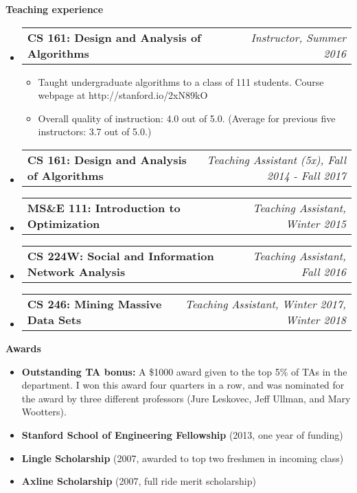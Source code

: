 \documentclass[letterpaper,10pt]{article}
\makeatletter
\newcommand{\resheading}[1]{{\large \colorbox{mygrey}{\begin{minipage}{\textwidth}{\textbf{#1 \vphantom{p\^{E}}}}\end{minipage}}}}
\newcommand{\ressubheading}[4]{
\begin{tabular*}{7.0in}{l@{\extracolsep{\fill}}r}
		\textbf{#1} & \textit{#4} \\
\end{tabular*}\vspace{-6pt}}
\makeatother
\begin{document}
\resheading{Teaching experience}
\begin{itemize}
\item
	\ressubheading{CS 161: Design and Analysis of Algorithms}{Stanford, CA}{Instructor}{Instructor, Summer 2016}
	\begin{itemize}
	\item Taught undergraduate algorithms to a class of 111 students.  Course webpage at http://stanford.io/2xN89kO
	\item Overall quality of instruction: 4.0 out of 5.0.  (Average for previous five instructors: 3.7 out of 5.0.)
	\end{itemize}
\item
	\ressubheading{CS 161: Design and Analysis of Algorithms}{Stanford, CA}{Teaching Assistant}{Teaching Assistant (5x), Fall 2014 - Fall 2017}
\item
	\ressubheading{MS\&E 111: Introduction to Optimization}{Stanford, CA}{Teaching Assistant}{Teaching Assistant, Winter 2015}
\item
	\ressubheading{CS 224W: Social and Information Network Analysis}{Stanford, CA}{Teaching Assistant}{Teaching Assistant, Fall 2016}
\item
	\ressubheading{CS 246: Mining Massive Data Sets}{Stanford, CA}{Teaching Assistant}{Teaching Assistant, Winter 2017, Winter 2018}
\end{itemize}

\resheading{Awards}
\begin{itemize}
    \item \textbf{Outstanding TA bonus:} A \$1000 award given to the top 5\% of TAs in the department.  I won this award four quarters in a row, and was nominated for the award by three different professors (Jure Leskovec, Jeff Ullman, and Mary Wootters).
	\item \textbf{Stanford School of Engineering Fellowship} (2013, one year of funding)
	\item \textbf{Lingle Scholarship} (2007, awarded to top two freshmen in incoming class)
	\item \textbf{Axline Scholarship} (2007, full ride merit scholarship)
\end{itemize}
\end{document}
